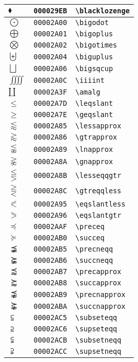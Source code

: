 \begin{longtable}{|l|l|l|}
\hline
$\blacklozenge$ & \texttt{000029EB} & \verb|\blacklozenge| \\
\hline
$\bigodot$ & \texttt{00002A00} & \verb|\bigodot| \\
\hline
$\bigoplus$ & \texttt{00002A01} & \verb|\bigoplus| \\
\hline
$\bigotimes$ & \texttt{00002A02} & \verb|\bigotimes| \\
\hline
$\biguplus$ & \texttt{00002A04} & \verb|\biguplus| \\
\hline
$\bigsqcup$ & \texttt{00002A06} & \verb|\bigsqcup| \\
\hline
$\iiiint$ & \texttt{00002A0C} & \verb|\iiiint| \\
\hline
$\amalg$ & \texttt{00002A3F} & \verb|\amalg| \\
\hline
$\leqslant$ & \texttt{00002A7D} & \verb|\leqslant| \\
\hline
$\geqslant$ & \texttt{00002A7E} & \verb|\geqslant| \\
\hline
$\lessapprox$ & \texttt{00002A85} & \verb|\lessapprox| \\
\hline
$\gtrapprox$ & \texttt{00002A86} & \verb|\gtrapprox| \\
\hline
$\lnapprox$ & \texttt{00002A89} & \verb|\lnapprox| \\
\hline
$\gnapprox$ & \texttt{00002A8A} & \verb|\gnapprox| \\
\hline
$\lesseqqgtr$ & \texttt{00002A8B} & \verb|\lesseqqgtr| \\
\hline
$\gtreqqless$ & \texttt{00002A8C} & \verb|\gtreqqless| \\
\hline
$\eqslantless$ & \texttt{00002A95} & \verb|\eqslantless| \\
\hline
$\eqslantgtr$ & \texttt{00002A96} & \verb|\eqslantgtr| \\
\hline
$\preceq$ & \texttt{00002AAF} & \verb|\preceq| \\
\hline
$\succeq$ & \texttt{00002AB0} & \verb|\succeq| \\
\hline
$\precneqq$ & \texttt{00002AB5} & \verb|\precneqq| \\
\hline
$\succneqq$ & \texttt{00002AB6} & \verb|\succneqq| \\
\hline
$\precapprox$ & \texttt{00002AB7} & \verb|\precapprox| \\
\hline
$\succapprox$ & \texttt{00002AB8} & \verb|\succapprox| \\
\hline
$\precnapprox$ & \texttt{00002AB9} & \verb|\precnapprox| \\
\hline
$\succnapprox$ & \texttt{00002ABA} & \verb|\succnapprox| \\
\hline
$\subseteqq$ & \texttt{00002AC5} & \verb|\subseteqq| \\
\hline
$\supseteqq$ & \texttt{00002AC6} & \verb|\supseteqq| \\
\hline
$\subsetneqq$ & \texttt{00002ACB} & \verb|\subsetneqq| \\
\hline
$\supsetneqq$ & \texttt{00002ACC} & \verb|\supsetneqq| \\
\hline
\end{longtable}

